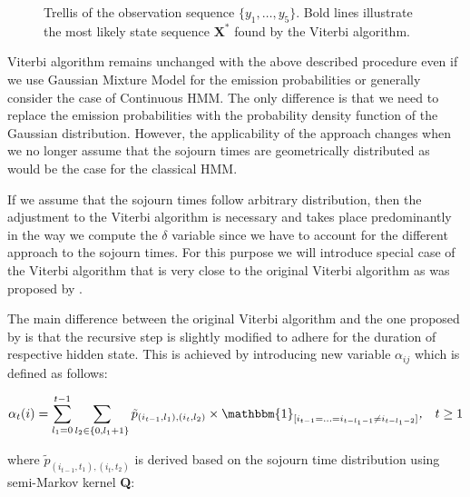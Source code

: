 \begin{figure}[htbp]
\begin{center}
\end{center}
\label{fig:viterbi}
\caption[Viterbi path through trellis]{Trellis of the observation sequence $\{y_1, \ldots,y_5\}$. Bold lines illustrate the most likely state sequence $\textbf{X}^*$ found by the Viterbi algorithm.}
\end{figure}

Viterbi algorithm remains unchanged with the above described procedure even if we use Gaussian Mixture Model for the emission probabilities or generally 
consider the case of Continuous HMM. The only difference is that we need to replace the emission probabilities with the probability density function of the Gaussian distribution.
However, the applicability of the approach changes when we no longer assume that the sojourn times are geometrically distributed as would be the case for the classical HMM. 

If we assume that the sojourn times follow arbitrary distribution, then the adjustment to the Viterbi algorithm is necessary and 
takes place predominantly in the way we compute the $\delta$ variable since we have to account for the different 
approach to the sojourn times. For this purpose we will introduce special case of the Viterbi algorithm that 
is very close to the original Viterbi algorithm as was proposed by \citep{Pertsinidou2015}.

The main difference between the original Viterbi algorithm and the one proposed by \citep{Pertsinidou2015} is that the 
recursive step is slightly modified to adhere for the duration of respective hidden state. This is achieved by 
introducing new variable $\alpha_{ij}$ which is defined as follows:

\begin{equation}
    \alpha_{t}(i) = \sum\limits_{l_1=0}^{t-1} \sum\limits_{l_2 \in \{0,l_1+1\}} \tilde{p}_{(i_{t-1},l_1),(i_{t},l_2)} \times \mathbbm{1}_{[i_{t-1}=\ldots=i_{t-l_1-1} \neq i_{t-l_1-2}]} \textit{,} \quad t \geq 1
\end{equation}

where $\tilde{p}_{(i_{t-1},t_1),(i_{t},t_2)}$ is derived based on the sojourn time distribution using semi-Markov kernel \textbf{Q}:

